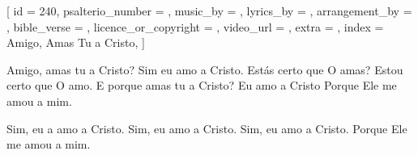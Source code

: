
[
    id                     = {240},
    psalterio_number       = {},
    music_by               = {},
    lyrics_by              = {},
    arrangement_by         = {},
    bible_verse            = {},
    licence_or_copyright   = {},
    video_url              = {},
    extra                  = {},
    index                  = {Amigo, Amas Tu a Cristo},
]


\beginverse
Amigo, amas tu a Cristo?
Sim eu amo a Cristo.
Estás certo que O amas?
Estou certo que O amo.
E porque amas tu a Cristo?
Eu amo a Cristo
Porque Ele me amou a mim.
\endverse


\beginchorus

Sim, eu a amo a Cristo.
Sim, eu amo a Cristo.
Sim, eu amo a Cristo.
Porque Ele me amou a mim.

\endchorus



\endsong

